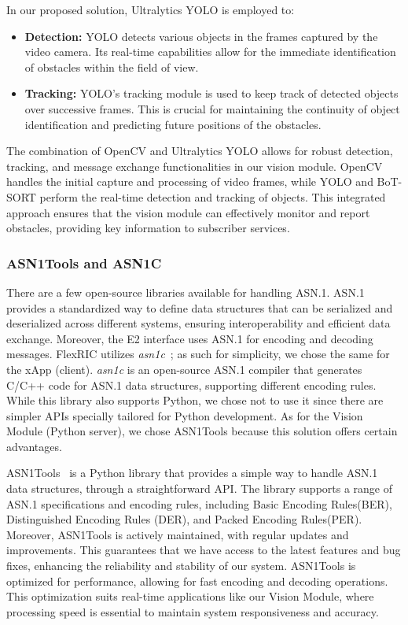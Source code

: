 In our proposed solution, Ultralytics YOLO is employed to:
\begin{itemize}
    \item \textbf{Detection:} YOLO detects various objects in the frames captured by the video camera.
    Its real-time capabilities allow for the immediate identification of obstacles within the field of view.
    \item \textbf{Tracking:} YOLO’s tracking module is used to keep track of detected objects over successive frames.
    This is crucial for maintaining the continuity of object identification and predicting future positions of the obstacles. %
\end{itemize}

The combination of OpenCV and Ultralytics YOLO allows for robust detection, tracking, and message exchange functionalities in our vision module.
OpenCV handles the initial capture and processing of video frames, while YOLO and BoT-SORT perform the real-time detection and tracking of objects.
This integrated approach ensures that the vision module can effectively monitor and report obstacles, providing key information to subscriber services.

\subsubsection{ASN1Tools and ASN1C}
There are a few open-source libraries available for handling ASN.1.
ASN.1 provides a standardized way to define data structures that can be serialized and deserialized across different systems, ensuring interoperability and efficient data exchange.
Moreover, the E2 interface uses ASN.1 for encoding and decoding messages.
FlexRIC utilizes \emph{asn1c}~\cite{asn1c}; as such for simplicity, we chose the same for the xApp (client).
\emph{asn1c} is an open-source ASN.1 compiler that generates C/C++ code for ASN.1 data structures, supporting different encoding rules.
While this library also supports Python, we chose not to use it since there are simpler APIs specially tailored for Python development.
As for the Vision Module (Python server), we chose ASN1Tools because this solution offers certain advantages.

ASN1Tools~\cite{asn1tools} is a Python library that provides a simple way to handle ASN.1 data structures, through a straightforward API\@.
The library supports a range of ASN.1 specifications and encoding rules, including Basic Encoding Rules(BER), Distinguished Encoding Rules (DER), and Packed Encoding Rules(PER)\@.
Moreover, ASN1Tools is actively maintained, with regular updates and improvements.
This guarantees that we have access to the latest features and bug fixes, enhancing the reliability and stability of our system.
ASN1Tools is optimized for performance, allowing for fast encoding and decoding operations.
This optimization suits real-time applications like our Vision Module, where processing speed is essential to maintain system responsiveness and accuracy.

